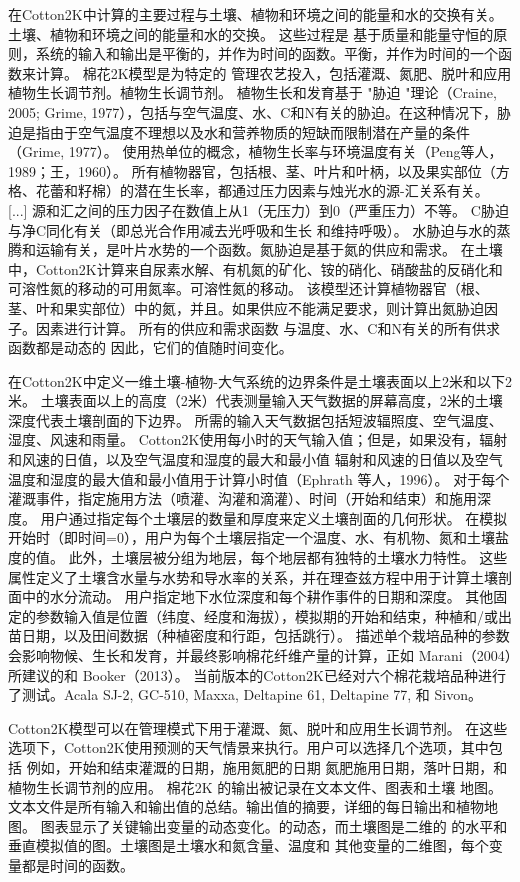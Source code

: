 在Cotton2K中计算的主要过程与土壤、植物和环境之间的能量和水的交换有关。土壤、植物和环境之间的能量和水的交换。
这些过程是 基于质量和能量守恒的原则，系统的输入和输出是平衡的，并作为时间的函数。平衡，并作为时间的一个函数来计算。
棉花2K模型是为特定的 管理农艺投入，包括灌溉、氮肥、脱叶和应用植物生长调节剂。植物生长调节剂。
植物生长和发育基于 "胁迫 "理论（Craine, 2005; Grime, 1977），包括与空气温度、水、C和N有关的胁迫。在这种情况下，胁迫是指由于空气温度不理想以及水和营养物质的短缺而限制潜在产量的条件（Grime, 1977）。
使用热单位的概念，植物生长率与环境温度有关（Peng等人，1989；王，1960）。
所有植物器官，包括根、茎、叶片和叶柄，以及果实部位（方格、花蕾和籽棉）的潜在生长率，都通过压力因素与烛光水的源-汇关系有关。 [...] 
源和汇之间的压力因子在数值上从1（无压力）到0（严重压力）不等。
C胁迫与净C同化有关（即总光合作用减去光呼吸和生长 和维持呼吸）。
水胁迫与水的蒸腾和运输有关，是叶片水势的一个函数。氮胁迫是基于氮的供应和需求。
在土壤中，Cotton2K计算来自尿素水解、有机氮的矿化、铵的硝化、硝酸盐的反硝化和可溶性氮的移动的可用氮率。可溶性氮的移动。
该模型还计算植物器官（根、茎、叶和果实部位）中的氮，并且。如果供应不能满足要求，则计算出氮胁迫因子。因素进行计算。
所有的供应和需求函数 与温度、水、C和N有关的所有供求函数都是动态的 因此，它们的值随时间变化。

在Cotton2K中定义一维土壤-植物-大气系统的边界条件是土壤表面以上2米和以下2米。
土壤表面以上的高度（2米）代表测量输入天气数据的屏幕高度，2米的土壤深度代表土壤剖面的下边界。
所需的输入天气数据包括短波辐照度、空气温度、湿度、风速和雨量。
Cotton2K使用每小时的天气输入值；但是，如果没有，辐射和风速的日值，以及空气温度和湿度的最大和最小值
辐射和风速的日值以及空气温度和湿度的最大值和最小值用于计算小时值（Ephrath 等人，1996）。
对于每个灌溉事件，指定施用方法（喷灌、沟灌和滴灌）、时间（开始和结束）和施用深度。
用户通过指定每个土壤层的数量和厚度来定义土壤剖面的几何形状。
在模拟开始时（即时间=0），用户为每个土壤层指定一个温度、水、有机物、氮和土壤盐度的值。
此外，土壤层被分组为地层，每个地层都有独特的土壤水力特性。
这些属性定义了土壤含水量与水势和导水率的关系，并在理查兹方程中用于计算土壤剖面中的水分流动。
用户指定地下水位深度和每个耕作事件的日期和深度。
其他固定的参数输入值是位置（纬度、经度和海拔），模拟期的开始和结束，种植和/或出苗日期，以及田间数据（种植密度和行距，包括跳行）。
描述单个栽培品种的参数会影响物候、生长和发育，并最终影响棉花纤维产量的计算，正如 Marani（2004）所建议的和
Booker（2013）。
当前版本的Cotton2K已经对六个棉花栽培品种进行了测试。Acala SJ-2, GC-510, Maxxa, Deltapine 61, Deltapine 77, 和 Sivon。

Cotton2K模型可以在管理模式下用于灌溉、氮、脱叶和应用生长调节剂。
在这些选项下，Cotton2K使用预测的天气情景来执行。用户可以选择几个选项，其中包括 例如，开始和结束灌溉的日期，施用氮肥的日期 氮肥施用日期，落叶日期，和 植物生长调节剂的应用。
棉花2K 的输出被记录在文本文件、图表和土壤 地图。文本文件是所有输入和输出值的总结。输出值的摘要，详细的每日输出和植物地图。
图表显示了关键输出变量的动态变化。的动态，而土壤图是二维的 的水平和垂直模拟值的图。土壤图是土壤水和氮含量、温度和 其他变量的二维图，每个变量都是时间的函数。

